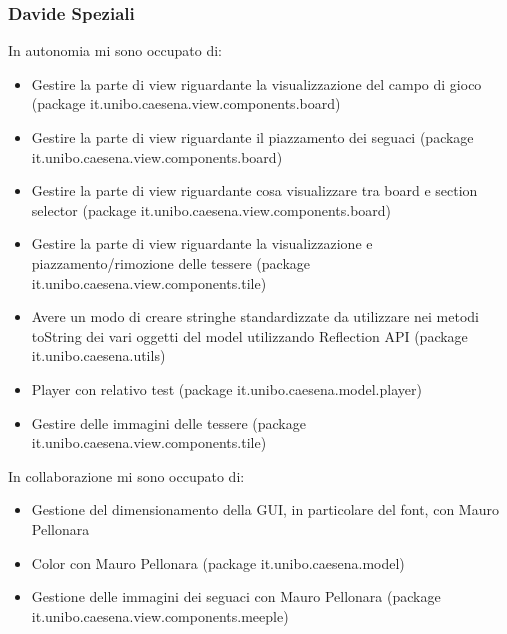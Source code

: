 \subsubsection*{Davide Speziali}
In autonomia mi sono occupato di:
\begin{itemize}
    \item Gestire la parte di view riguardante la visualizzazione del campo di gioco (package it.unibo.caesena.view.components.board)
    \item Gestire la parte di view riguardante il piazzamento dei seguaci (package it.unibo.caesena.view.components.board)
    \item Gestire la parte di view riguardante cosa visualizzare tra board e section selector (package it.unibo.caesena.view.components.board)
    \item Gestire la parte di view riguardante la visualizzazione e piazzamento/rimozione delle tessere (package it.unibo.caesena.view.components.tile)
    \item Avere un modo di creare stringhe standardizzate da utilizzare nei metodi toString dei vari oggetti del model utilizzando Reflection API (package it.unibo.caesena.utils)
    \item Player con relativo test (package it.unibo.caesena.model.player)
    \item Gestire delle immagini delle tessere (package it.unibo.caesena.view.components.tile)
\end{itemize}
In collaborazione mi sono occupato di:
\begin{itemize}
    \item Gestione del dimensionamento della GUI, in particolare del font, con Mauro Pellonara
    \item Color con Mauro Pellonara (package it.unibo.caesena.model)
    \item Gestione delle immagini dei seguaci con Mauro Pellonara (package it.unibo.caesena.view.components.meeple)
\end{itemize}

